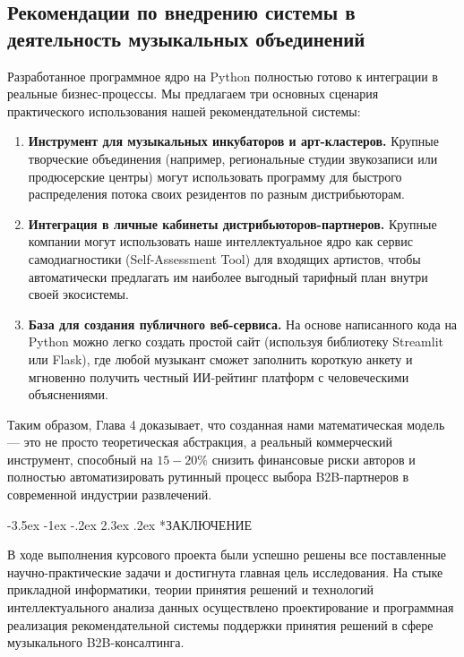 \documentclass[14pt, a4paper]{extarticle}
\makeatletter
\renewcommand\section{\@startsection {section}{1}{\z@}%
 {-3.5ex \@plus -1ex \@minus -.2ex}%
 {2.3ex \@plus.2ex}%
{\centering\normalfont\Large\bfseries}}
\makeatother
\begin{document}
\subsection{Рекомендации по внедрению системы в деятельность музыкальных объединений}
Разработанное программное ядро на Python полностью готово к интеграции в реальные бизнес-процессы. Мы предлагаем три основных сценария практического использования нашей рекомендательной системы:
\begin{enumerate}
    \item \textbf{Инструмент для музыкальных инкубаторов и арт-кластеров.} Крупные творческие объединения (например, региональные студии звукозаписи или продюсерские центры) могут использовать программу для быстрого распределения потока своих резидентов по разным дистрибьюторам.
    \item \textbf{Интеграция в личные кабинеты дистрибьюторов-партнеров.} Крупные компании могут использовать наше интеллектуальное ядро как сервис самодиагностики (Self-Assessment Tool) для входящих артистов, чтобы автоматически предлагать им наиболее выгодный тарифный план внутри своей экосистемы.
    \item \textbf{База для создания публичного веб-сервиса.} На основе написанного кода на Python можно легко создать простой сайт (используя библиотеку Streamlit или Flask), где любой музыкант сможет заполнить короткую анкету и мгновенно получить честный ИИ-рейтинг платформ с человеческими объяснениями.
\end{enumerate}

Таким образом, Глава 4 доказывает, что созданная нами математическая модель — это не просто теоретическая абстракция, а реальный коммерческий инструмент, способный на $15-20\%$ снизить финансовые риски авторов и полностью автоматизировать рутинный процесс выбора B2B-партнеров в современной индустрии развлечений.


\newpage
\section*{ЗАКЛЮЧЕНИЕ}

В ходе выполнения курсового проекта были успешно решены все поставленные научно-практические задачи и достигнута главная цель исследования. На стыке прикладной информатики, теории принятия решений и технологий интеллектуального анализа данных осуществлено проектирование и программная реализация рекомендательной системы поддержки принятия решений в сфере музыкального B2B-консалтинга.
\end{document}
